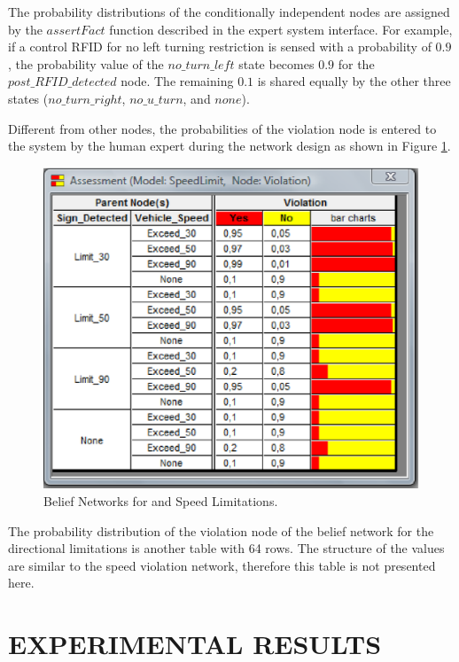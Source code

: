 \documentclass[letterpaper, 10 pt, conference]{ieeeconf}
\begin{document}
The probability distributions of the conditionally independent nodes are assigned by the $assertFact$ function described in the expert system interface. For example, if a control RFID for no left turning restriction is sensed with a probability of $0.9$, the probability value of the $no\_turn\_left$ state becomes $0.9$ for the $post\_RFID\_detected$ node. The remaining $0.1$ is shared equally by the other three states ($no\_turn\_right$, $no\_u\_turn$, and $none$).

Different from other nodes, the probabilities of the violation node is entered to the system by the human expert during the network design as shown in Figure \ref{fig:prob}.

\begin{figure}[thb]
      \centering
      \includegraphics[scale=0.5]{img/prob}
      \caption{Belief Networks for and Speed Limitations.}
      \label{fig:prob}
\end{figure}

The probability distribution of the violation node of the belief network for the directional limitations is another table with 64 rows. The structure of the values are similar to the speed violation network, therefore this table is not presented here.

\section{EXPERIMENTAL RESULTS}
\label{sec:experimental}
\end{document}
